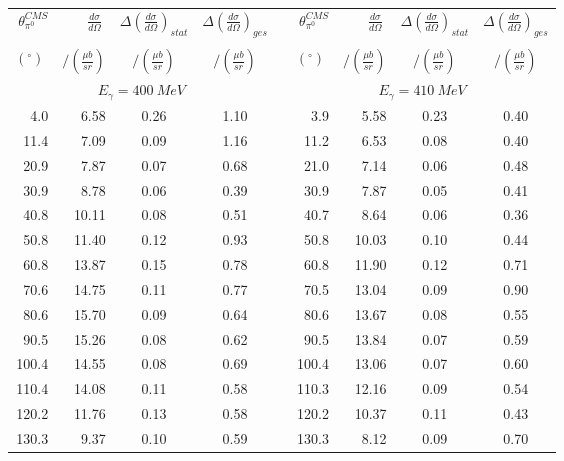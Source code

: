 \begin{table}[htbp] 
\begin{center} 
\begin{tabular}{|r|r|c|c|l|r|r|c|c|} 

\cline{1-4}
\cline{6-9} 
$\theta_{\pi^0}^{CMS}$ & 
$\displaystyle\frac{d\sigma}{d\Omega}\;$ & 
${\Delta}\left( \frac{d\sigma}{d\Omega}\right)_{stat}$ & 
${\Delta}\left( \frac{d\sigma}{d\Omega}\right)_{ges}$ & & 
$\theta_{\pi^0}^{CMS}$ & 
$\displaystyle\frac{d\sigma}{d\Omega}\;$ & 
${\Delta}\left( \frac{d\sigma}{d\Omega}\right)_{stat}$ & 
${\Delta}\left( \frac{d\sigma}{d\Omega}\right)_{ges}$ \\ 
& & & & & & & &\\ 
 $(^{\circ})\;$ & $/(\frac{{\mu}b}{sr})$ & $/(\frac{{\mu}b}{sr})$ & $/(\frac{{\mu}b}{sr})$ & & $(^{\circ})\;$ & $/(\frac{{\mu}b}{sr})$ & $/(\frac{{\mu}b}{sr})$ & $/(\frac{{\mu}b}{sr})$ \\ 
\cline{1-4} 
\cline{6-9} 
\multicolumn{4}{|c|}{ $E_{\gamma}=400~MeV$} & & 
\multicolumn{4}{c|}{ $E_{\gamma}=410~MeV$} \\ 
\cline{1-4} 
\cline{6-9} 
  4.0 &  6.58 &  0.26 &  1.10 & &   3.9 &  5.58 &  0.23 &  0.40 \\ 
 11.4 &  7.09 &  0.09 &  1.16 & &  11.2 &  6.53 &  0.08 &  0.40 \\ 
 20.9 &  7.87 &  0.07 &  0.68 & &  21.0 &  7.14 &  0.06 &  0.48 \\ 
 30.9 &  8.78 &  0.06 &  0.39 & &  30.9 &  7.87 &  0.05 &  0.41 \\ 
 40.8 & 10.11 &  0.08 &  0.51 & &  40.7 &  8.64 &  0.06 &  0.36 \\ 
 50.8 & 11.40 &  0.12 &  0.93 & &  50.8 & 10.03 &  0.10 &  0.44 \\ 
 60.8 & 13.87 &  0.15 &  0.78 & &  60.8 & 11.90 &  0.12 &  0.71 \\ 
 70.6 & 14.75 &  0.11 &  0.77 & &  70.5 & 13.04 &  0.09 &  0.90 \\ 
 80.6 & 15.70 &  0.09 &  0.64 & &  80.6 & 13.67 &  0.08 &  0.55 \\ 
 90.5 & 15.26 &  0.08 &  0.62 & &  90.5 & 13.84 &  0.07 &  0.59 \\ 
100.4 & 14.55 &  0.08 &  0.69 & & 100.4 & 13.06 &  0.07 &  0.60 \\ 
110.4 & 14.08 &  0.11 &  0.58 & & 110.3 & 12.16 &  0.09 &  0.54 \\ 
120.2 & 11.76 &  0.13 &  0.58 & & 120.2 & 10.37 &  0.11 &  0.43 \\ 
130.3 &  9.37 &  0.10 &  0.59 & & 130.3 &  8.12 &  0.09 &  0.70 \\ 

\end{tabular}
\end{center}
\end{table}
